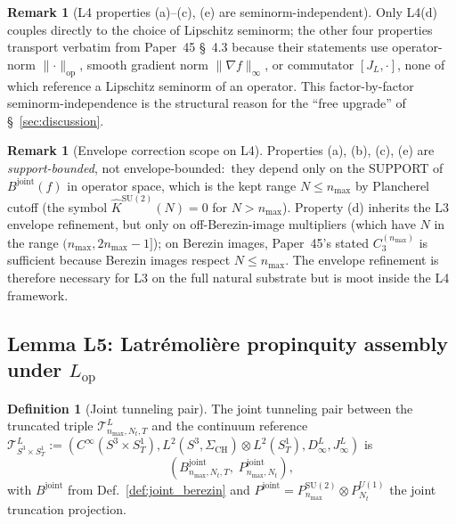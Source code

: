 \documentclass[11pt,a4paper]{article}
\theoremstyle{plain}
\theoremstyle{definition}
\newtheorem{definition}[theorem]{Definition}
\newtheorem{remark}[theorem]{Remark}
\newcommand{\nmax}{n_{\max}}
\newcommand{\Nt}{N_{t}}
\newcommand{\sthree}{S^{3}}
\newcommand{\SoneT}{S^{1}_{T}}
\newcommand{\Manifold}{S^{3}\times S^{1}_{T}}
\newcommand{\Tcal}{\mathcal{T}}
\newcommand{\opnorm}[1]{\lVert #1 \rVert_{\mathrm{op}}}
\newcommand{\norm}[1]{\lVert #1 \rVert}
\newcommand{\SU}{\mathrm{SU}}
\newcommand{\Uone}{U(1)}
\newcommand{\JL}{J_{L}}
\newcommand{\Lop}{L_{\mathrm{op}}}
\newcommand{\Bjoint}{B^{\mathrm{joint}}}
\newcommand{\Pjoint}{P^{\mathrm{joint}}}
\newcommand{\Plancherel}{\hat}
\begin{document}
\begin{remark}[L4 properties (a)--(c), (e) are seminorm-independent]
\label{rem:L4_seminorm_independent}
Only L4(d) couples directly to the choice of Lipschitz seminorm; the
other four properties transport verbatim from Paper~45 \S~4.3 because
their statements use operator-norm $\opnorm{\cdot}$, smooth gradient
norm $\norm{\nabla f}_{\infty}$, or commutator $[\JL, \cdot]$, none of
which reference a Lipschitz seminorm of an operator. This factor-by-factor
seminorm-independence is the structural reason for the ``free upgrade''
of \S~\ref{sec:discussion}.
\end{remark}

\begin{remark}[Envelope correction scope on L4]\label{rem:L4_no_envelope}
Properties (a), (b), (c), (e) are \emph{support-bounded}, not
envelope-bounded:\ they depend only on the SUPPORT of $\Bjoint(f)$ in
operator space, which is the kept range $N \le \nmax$ by Plancherel
cutoff (the symbol $\Plancherel{K}^{\SU(2)}(N) = 0$ for $N > \nmax$).
Property (d) inherits the L3 envelope refinement, but only on
off-Berezin-image multipliers (which have $N$ in the range
$(\nmax, 2\nmax - 1]$); on Berezin images, Paper~45's stated
$C_{3}^{(\nmax)}$ is sufficient because Berezin images respect
$N \le \nmax$. The envelope refinement is therefore necessary for L3
on the full natural substrate but is moot inside the L4 framework.
\end{remark}

\subsection{Lemma L5: Latr\'emoli\`ere propinquity assembly under $\Lop$}
\label{sec:L5}

\begin{definition}[Joint tunneling pair]\label{def:tunneling_pair}
The joint tunneling pair between the truncated triple
$\Tcal^{L}_{\nmax, \Nt, T}$ and the continuum reference
$\Tcal^{L}_{\Manifold}
:= (C^{\infty}(\Manifold), L^{2}(\sthree, \Sigma_{\mathrm{CH}}) \otimes
L^{2}(\SoneT), D^{L}_{\infty}, J^{L}_{\infty})$ is
\begin{equation*}
   (\Bjoint_{\nmax, \Nt, T},\; \Pjoint_{\nmax, \Nt}),
\end{equation*}
with $\Bjoint$ from Def.~\ref{def:joint_berezin} and
$\Pjoint = P^{\SU(2)}_{\nmax} \otimes P^{\Uone}_{\Nt}$ the joint
truncation projection.
\end{definition}
\end{document}
